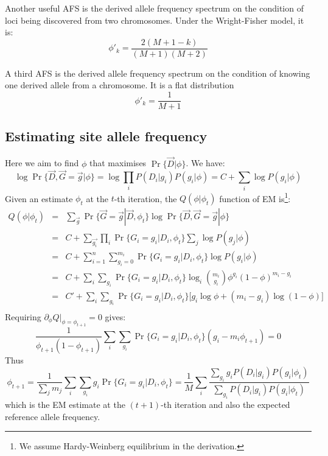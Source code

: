 \documentclass[pdftex,10pt]{book}
\begin{document}
Another useful AFS is the derived allele frequency spectrum on the
condition of loci being discovered from two chromosomes. Under the
Wright-Fisher model, it is:
$$
\phi'_k=\frac{2(M+1-k)}{(M+1)(M+2)}
$$

A third AFS is the derived allele frequency spectrum on the condition of
knowing one derived allele from a chromosome. It is a flat distribution
$$
\phi'_k=\frac{1}{M+1}
$$

\subsection{Estimating site allele frequency}
Here we aim to find $\phi$ that maximises $\Pr\{\vec{D}|\phi\}$. We have:
$$\log \Pr\{\vec{D},\vec{G}=\vec{g}|\phi\}=\log\prod_iP(D_i|g_i)P(g_i|\phi)=C+\sum_i\log P(g_i|\phi)$$
Given an estimate $\phi_t$ at the $t$-th iteration, the $Q(\phi|\phi_t)$
function of EM is\footnote{We assume Hardy-Weinberg equilibrium in the
  derivation.}:
\begin{eqnarray*}
  Q(\phi|\phi_t)&=&\sum_{\vec{g}}\Pr\{\vec{G}=\vec{g}|\vec{D},\phi_t\}\log \Pr\{\vec{D},\vec{G}=\vec{g}|\phi\}\\
  &=&C+\sum_{\vec{g_i}}\prod_i\Pr\{G_i=g_i|D_i,\phi_t\}\sum_j\log P(g_j|\phi)\\
  &=&C+\sum_{i=1}^n\sum_{g_i=0}^{m_i}\Pr\{G_i=g_i|D_i,\phi_t\}\log P(g_i|\phi)\\
  &=&C+\sum_i\sum_{g_i}\Pr\{G_i=g_i|D_i,\phi_t\}\log_i \binom{m_i}{g_i}\phi^{g_i}(1-\phi)^{m_i-g_i}\\
  &=&C'+\sum_i\sum_{g_i}\Pr\{G_i=g_i|D_i,\phi_t\}\Big[g_i\log\phi+(m_i-g_i)\log(1-\phi)\Big]\\
\end{eqnarray*}
Requiring $\partial_{\phi}Q\Big|_{\phi=\phi_{t+1}}=0$ gives:
$$\frac{1}{\phi_{t+1}(1-\phi_{t+1})}\sum_i\sum_{g_i}\Pr\{G_i=g_i|D_i,\phi_t\}(g_i-m_i\phi_{t+1})=0$$
Thus
\begin{equation}\label{equ:freq1}
\phi_{t+1}=\frac{1}{\sum_jm_j}\sum_i\sum_{g_i}g_i\Pr\{G_i=g_i|D_i,\phi_t\}
=\frac{1}{M}\sum_i\frac{\sum_{g_i}g_iP(D_i|g_i)P(g_i|\phi_t)}{\sum_{g_i}P(D_i|g_i)P(g_i|\phi_t)}
\end{equation}
which is the EM estimate at the $(t+1)$-th iteration and also the
expected reference allele frequency.
\end{document}
